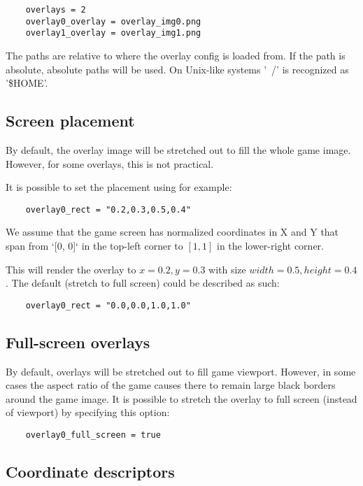 \documentclass[a4paper, 11pt]{article}
\begin{document}
\begin{verbatim}
    overlays = 2
    overlay0_overlay = overlay_img0.png
    overlay1_overlay = overlay_img1.png
\end{verbatim}

The paths are relative to where the overlay config is loaded from. If the path is absolute, absolute paths will be used. On Unix-like systems '~/' is recognized as '\$HOME'.

\subsection*{Screen placement}

By default, the overlay image will be stretched out to fill the whole game image.
However, for some overlays, this is not practical.

It is possible to set the placement using for example:

\begin{verbatim}
    overlay0_rect = "0.2,0.3,0.5,0.4"
\end{verbatim}

We assume that the game screen has normalized coordinates in X and Y that span from `[0, 0]`
in the top-left corner to $[1, 1]$ in the lower-right corner.

This will render the overlay to $x = 0.2, y = 0.3$ with size $width = 0.5, height = 0.4$.
The default (stretch to full screen) could be described as such:

\begin{verbatim}
    overlay0_rect = "0.0,0.0,1.0,1.0"
\end{verbatim}

\subsection*{Full-screen overlays}

By default, overlays will be stretched out to fill game viewport. However, in some cases
the aspect ratio of the game causes there to remain large black borders around the game image.
It is possible to stretch the overlay to full screen (instead of viewport) by specifying this option:

\begin{verbatim}
    overlay0_full_screen = true
\end{verbatim}

\subsection*{Coordinate descriptors}
\end{document}
